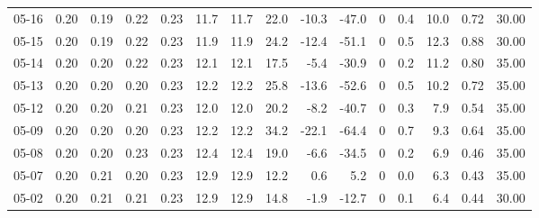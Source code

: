 \begin{threeparttable}
{\begin{tabular}{lrrrrrrrrrrrrrr}
  05-16 &          0.20 &          0.19 &          0.22 &        0.23 &                11.7 &               11.7 &                22.0 &      -10.3 &        -47.0 &              0 &                 0.4 &             10.0 &            0.72 &                  30.00 \\
  05-15 &          0.20 &          0.19 &          0.22 &        0.23 &                11.9 &               11.9 &                24.2 &      -12.4 &        -51.1 &              0 &                 0.5 &             12.3 &            0.88 &                  30.00 \\
  05-14 &          0.20 &          0.20 &          0.22 &        0.23 &                12.1 &               12.1 &                17.5 &       -5.4 &        -30.9 &              0 &                 0.2 &             11.2 &            0.80 &                  35.00 \\
  05-13 &          0.20 &          0.20 &          0.20 &        0.23 &                12.2 &               12.2 &                25.8 &      -13.6 &        -52.6 &              0 &                 0.5 &             10.2 &            0.72 &                  35.00 \\
  05-12 &          0.20 &          0.20 &          0.21 &        0.23 &                12.0 &               12.0 &                20.2 &       -8.2 &        -40.7 &              0 &                 0.3 &              7.9 &            0.54 &                  35.00 \\
  05-09 &          0.20 &          0.20 &          0.20 &        0.23 &                12.2 &               12.2 &                34.2 &      -22.1 &        -64.4 &              0 &                 0.7 &              9.3 &            0.64 &                  35.00 \\
  05-08 &          0.20 &          0.20 &          0.23 &        0.23 &                12.4 &               12.4 &                19.0 &       -6.6 &        -34.5 &              0 &                 0.2 &              6.9 &            0.46 &                  35.00 \\
  05-07 &          0.20 &          0.21 &          0.20 &        0.23 &                12.9 &               12.9 &                12.2 &        0.6 &          5.2 &              0 &                 0.0 &              6.3 &            0.43 &                  35.00 \\
  05-02 &          0.20 &          0.21 &          0.21 &        0.23 &                12.9 &               12.9 &                14.8 &       -1.9 &        -12.7 &              0 &                 0.1 &              6.4 &            0.44 &                  30.00 \\

\end{tabular}}
\end{threeparttable}

